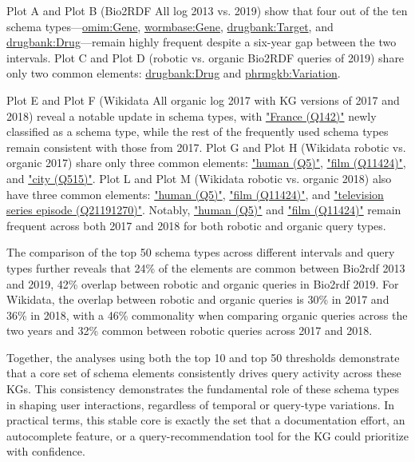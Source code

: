 \documentclass[sw]{iosart2x}
\begin{document}
Plot A and Plot B (Bio2RDF All log 2013 vs. 2019) show that four out of the ten schema types—\href{http://bio2rdf.org/omim:Gene}{omim:Gene}, \href{http://bio2rdf.org/wormbase:Gene}{wormbase:Gene}, \href{http://bio2rdf.org/drugbank:Target}{drugbank:Target}, and \href{http://bio2rdf.org/drugbank:Drug}{drugbank:Drug}—remain highly frequent despite a six-year gap between the two intervals. Plot C and Plot D (robotic vs. organic Bio2RDF queries of 2019) share only two common elements: \href{http://bio2rdf.org/drugbank:Drug}{drugbank:Drug} and \href{http://bio2rdf.org/phrmgkb:Variation}{phrmgkb:Variation}.

Plot E and Plot F (Wikidata All organic log 2017 with KG versions of 2017 and 2018) reveal a notable update in schema types, with \href{https://www.wikidata.org/wiki/Q142}{"France (Q142)"} newly classified as a schema type, while the rest of the frequently used schema types remain consistent with those from 2017. Plot G and Plot H (Wikidata robotic vs. organic 2017) share only three common elements: \href{https://www. wikidata.org/wiki/Q5}{"human (Q5)"}, \href{https://www.wikidata.org/wiki/Q11424}{"film (Q11424)"}, and \href{https://www.wikidata.org/wiki/Q515}{"city (Q515)"}. Plot L and Plot M (Wikidata robotic vs. organic 2018) also have three common elements: \href{https://www.wikidata.org/wiki/Q5}{"human (Q5)"}, \href{https://www.wikidata.org/wiki/Q11424}{"film (Q11424)"}, and \href{https://www.wikidata.org/wiki/Q21191270}{"television series episode (Q21191270)"}. Notably, \href{https://www.wikidata.org/wiki/Q5}{"human (Q5)"} and \href{https://www.wikidata.org/wiki/Q11424}{"film (Q11424)"} remain frequent across both 2017 and 2018 for both robotic and organic query types.

The comparison of the top 50 schema types across different intervals and query types further reveals that 24\% of the elements are common between Bio2rdf 2013 and 2019, 42\% overlap between robotic and organic queries in Bio2rdf 2019. For Wikidata, the overlap between robotic and organic queries is 30\% in 2017 and 36\% in 2018, with a 46\% commonality when comparing organic queries across the two years and 32\% common between robotic queries across 2017 and 2018.

Together, the analyses using both the top 10 and top 50 thresholds demonstrate that a core set of schema elements consistently drives query activity across these KGs. This consistency demonstrates the fundamental role of these schema types in shaping user interactions, regardless of temporal or query-type variations. In practical terms, this stable core is exactly the set that a documentation effort, an autocomplete feature, or a query-recommendation tool for the KG could prioritize with confidence.
\end{document}

